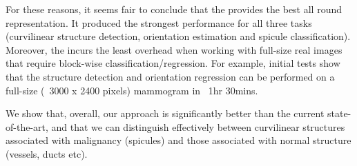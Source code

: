 For these reasons, it seems fair to conclude that the \dtcwt provides the best all round representation. It produced the strongest performance for all three tasks (curvilinear structure detection, orientation estimation and spicule classification). Moreover, the \dtcwt incurs the least overhead when working with full-size real images that require block-wise classification/regression. For example, initial tests show that the structure detection and orientation regression can be performed on a full-size (~3000 x 2400 pixels) mammogram in ~1hr 30mins.

We show that, overall, our approach is significantly better than the current state-of-the-art, and that we can distinguish effectively between curvilinear structures associated with malignancy (spicules) and those associated with normal structure (vessels, ducts etc).